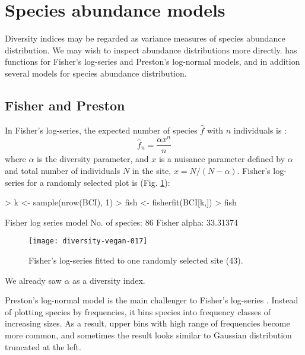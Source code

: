 \documentclass[a4paper,10pt,twocolumn]{article}
\begin{document}
\section{Species abundance models}

Diversity indices may be regarded as variance measures of species
abundance distribution.  We may wish to inspect abundance
distributions more directly.   has functions for
Fisher's log-series and Preston's log-normal models, and in addition
several models for species abundance distribution.

\subsection{Fisher and Preston}

In Fisher's log-series, the expected number of species $\hat f$ with $n$
individuals is \citep{FisherEtal43}:
\begin{equation}
\hat f_n = \frac{\alpha x^n}{n}
\end{equation}
where $\alpha$ is the diversity parameter, and $x$ is a nuisance
parameter defined by $\alpha$ and total number
of individuals $N$ in the site, $x = N/(N-\alpha)$.  Fisher's
log-series for a randomly selected plot is (Fig. \ref{fig:fisher}):
\begin{Schunk}
\begin{Sinput}
> k <- sample(nrow(BCI), 1)
> fish <- fisherfit(BCI[k,])
> fish
\end{Sinput}
\begin{Soutput}
Fisher log series model
No. of species: 86 
Fisher alpha:   33.31374 
\end{Soutput}
\end{Schunk}
\begin{figure}
\texttt{[image: diversity-vegan-017]}
\caption{Fisher's log-series fitted to one randomly selected site
  (43).}
\label{fig:fisher}
\end{figure}
We already saw $\alpha$ as a diversity index.

Preston's log-normal model is the main challenger to Fisher's
log-series \citep{Preston48}.  Instead of plotting species by
frequencies, it bins species into frequency classes of increasing
sizes.  As a result, upper bins with high range of frequencies become
more common, and sometimes the result looks similar to Gaussian
distribution truncated at the left.
\end{document}
